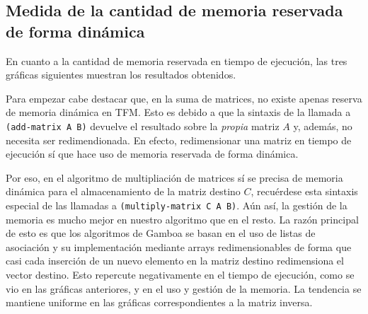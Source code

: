 \documentclass[a4paper,10pt]{article}
\begin{document}
\subsection{Medida de la cantidad de memoria reservada de forma dinámica}
\par \vspace{10pt}

En cuanto a la cantidad de memoria reservada en tiempo de ejecución, las tres gráficas siguientes muestran los resultados obtenidos.

\par \vspace{10pt}

Para empezar cabe destacar que, en la suma de matrices, no existe apenas reserva de memoria dinámica en TFM. Esto es debido a que la sintaxis de la llamada a \texttt{(add-matrix A B)} devuelve el resultado sobre la \emph{propia} matriz $A$ y, además, no necesita ser redimendionada. En efecto, redimensionar una matriz en tiempo de ejecución sí que hace uso de memoria reservada de forma dinámica.

\par \vspace{10pt}

Por eso, en el algoritmo de multipliación de matrices sí se precisa de memoria dinámica para el almacenamiento de la matriz destino $C$, recuérdese esta sintaxis especial de las llamadas a \texttt{(multiply-matrix C A B)}. Aún así, la gestión de la memoria es mucho mejor en nuestro algoritmo que en el resto. La razón principal de esto es que los algoritmos de Gamboa se basan en el uso de listas de asociación y su implementación mediante arrays redimensionables de forma que casi cada inserción de un nuevo elemento en la matriz destino redimensiona el vector destino. Esto repercute negativamente en el tiempo de ejecución, como se vio en las gráficas anteriores, y en el uso y gestión de la memoria. La tendencia se mantiene uniforme en las gráficas correspondientes a la matriz inversa.
\end{document}
